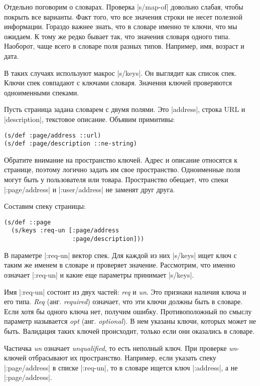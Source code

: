 Отдельно поговорим о словарах. Проверка \spverb|s/map-of| довольно слабая, чтобы
покрыть все варианты. Факт того, что все значения строки не несет полезной
информации. Гораздо важнее знать, что в словаре именно те ключи, что мы
ожидаем. К тому же редко бывает так, что значения словаря одного типа. Наоборот,
чаще всего в словаре поля разных типов. Например, имя, возраст и дата.

В таких случаях используют макрос \spverb|s/keys|. Он выглядит как список
спек. Ключи спек совпадают с ключами словаря. Значения ключей проверяются
одноименными спеками.

Пусть страница задана словарем с двумя полями. Это \spverb|address|, строка URL
и \spverb|description|, текстовое описание. Объявим примитивы:

\begin{verbatim}
(s/def :page/address ::url)
(s/def :page/description ::ne-string)
\end{verbatim}

Обратите внимание на пространство ключей. Адрес и описание относятся к странице,
поэтому логично задать им свое пространство. Одноименные поля могут быть у
пользователя или товара. Пространство обещает, что спеки \spverb|:page/address|
и \spverb|:user/address| не заменят друг друга.

Составим спеку страницы:

\begin{verbatim}
(s/def ::page
  (s/keys :req-un [:page/address
                   :page/description]))
\end{verbatim}

В параметре \spverb|:req-un| вектор спек. Для каждой из них \spverb|s/keys| ищет
ключ с таким же именем в словаре и проверяет значение. Рассмотрим, что именно
означает \spverb|:req-un| и какие еще параметры принимает \spverb|s/keys|.

Имя \spverb|:req-un| состоит из двух частей: \emph{req} и \emph{un}. Это
признаки наличия ключа и его типа. \emph{Req} (анг. \emph{required}) означает,
что эти ключи должны быть в словаре. Если хотя бы одного ключа нет, получим
ошибку. Противоположный по смыслу параметр называется \emph{opt}
(анг. \emph{optional}). В нем указаны ключи, которых может не быть. Валидация
таких ключей происходит, только если они оказались в словаре.

Частичка \emph{un} означает \emph{unqualified}, то есть неполный ключ. При
проверке \emph{un}-ключей отбрасывают их пространство. Например, если указать
спеку \spverb|:page/address| в списке \spverb|:req-un|, то в словаре ищется ключ
\spverb|:address|, а не \spverb|:page/address|.

